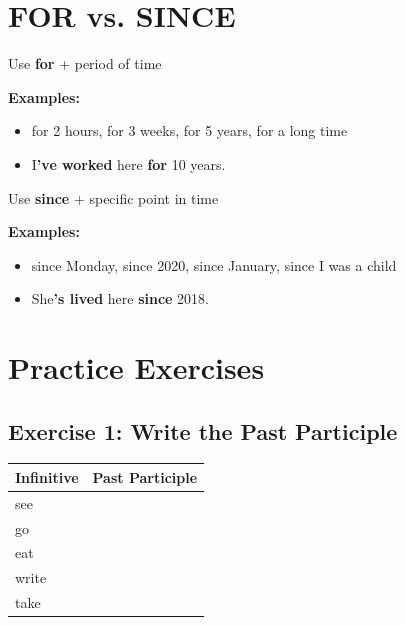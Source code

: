 \section{FOR vs. SINCE}

\begin{grammarbox}[title=FOR = Duration (how long)]
Use \textbf{for} + period of time

\textbf{Examples:}
\begin{itemize}
    \item for 2 hours, for 3 weeks, for 5 years, for a long time
    \item I\textbf{'ve worked} here \textbf{for} 10 years. 
\end{itemize}
\end{grammarbox}

\begin{grammarbox}[title=SINCE = Starting Point (when it started)]
Use \textbf{since} + specific point in time

\textbf{Examples:}
\begin{itemize}
    \item since Monday, since 2020, since January, since I was a child
    \item She\textbf{'s lived} here \textbf{since} 2018. 
\end{itemize}
\end{grammarbox}

\section{Practice Exercises}

\subsection{Exercise 1: Write the Past Participle}
\begin{table}[h]
\centering
\begin{tabular}{|l|l|}
\hline
\textbf{Infinitive} & \textbf{Past Participle} \\
\hline
see & \underline{\hspace{3cm}} \\
\hline
go & \underline{\hspace{3cm}} \\
\hline
eat & \underline{\hspace{3cm}} \\
\hline
write & \underline{\hspace{3cm}} \\
\hline
take & \underline{\hspace{3cm}} \\
\hline
\end{tabular}
\end{table}

